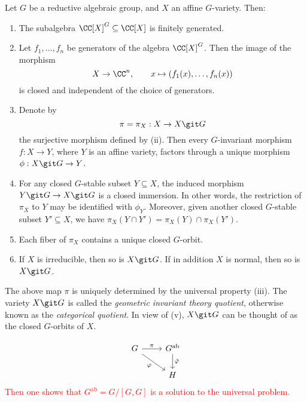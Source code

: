 
\begin{theorem}
    Let $G$ be a reductive algebraic group, and $X$ an affine $G$-variety. Then:
    \begin{enumerate}[label=(\roman*)]
    \item The subalgebra $\CC[X]^G \subseteq \CC[X]$ is finitely generated.
    \item Let $f_1, \ldots, f_n$ be generators of the algebra $\CC[X]^G$. Then the image of the morphism
    $$X \to \CC^n, \qquad x \mapsto (f_1(x), \ldots, f_n(x))$$
    is closed and independent of the choice of generators.
    \item Denote by
    $$\pi=\pi_X : X \to X \git G$$
    the surjective morphism defined by (ii). Then every $G$-invariant morphism $f : X \to Y$, where $Y$ is an affine variety, factors through a unique morphism $\phi: X \git G \to Y$.
    \item For any closed $G$-stable subset $Y \subseteq X$, the induced morphism $Y \git G \to X \git G$ is a closed immersion. In other words, the restriction of $\pi_X$ to $Y$ may be identified with $\phi_Y$. Moreover, given another closed $G$-stable subset $Y' \subseteq X$, we have $\pi_X(Y \cap Y') = \pi_X(Y) \cap \pi_X(Y').$
    \item Each fiber of $\pi_X$ contains a unique closed $G$-orbit.
    \item If $X$ is irreducible, then so is $X \git G$. If in addition $X$ is normal, then so is $X \git G$.
    \end{enumerate}
\end{theorem}

The above map $\pi$ is uniquely determined by the universal property (iii).
The variety $X \git G$ is called the \emph{geometric invariant theory quotient}, otherwise known as the \emph{categorical quotient}.
In view of (v), $X \git G$ can be thought of as the closed $G$-orbits of $X$.

\[
\begin{tikzcd} 
	G & {G^{\text{ab}}} \\
	& H
	\arrow["\pi", from=1-1, to=1-2]
	\arrow["\varphi"', from=1-1, to=2-2]
	\arrow["\tilde\varphi", from=1-2, to=2-2]
\end{tikzcd}
\]
\textcolor{red}{Then one shows that $G^\text{ab} = G/[G, G]$ is a solution to the universal problem.}
